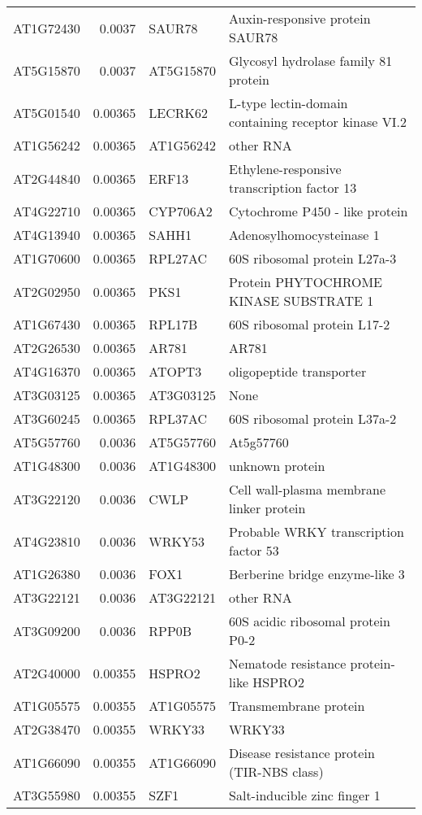 \documentclass[a4paper]{article}
\begin{document}
\begin{center}
\begin{tabular}{lrll}
AT1G72430 & 0.0037 & SAUR78 & Auxin-responsive protein SAUR78\\
AT5G15870 & 0.0037 & AT5G15870 & Glycosyl hydrolase family 81 protein\\
AT5G01540 & 0.00365 & LECRK62 & L-type lectin-domain containing receptor kinase VI.2\\
AT1G56242 & 0.00365 & AT1G56242 & other RNA\\
AT2G44840 & 0.00365 & ERF13 & Ethylene-responsive transcription factor 13\\
AT4G22710 & 0.00365 & CYP706A2 & Cytochrome P450 - like protein\\
AT4G13940 & 0.00365 & SAHH1 & Adenosylhomocysteinase 1\\
AT1G70600 & 0.00365 & RPL27AC & 60S ribosomal protein L27a-3\\
AT2G02950 & 0.00365 & PKS1 & Protein PHYTOCHROME KINASE SUBSTRATE 1\\
AT1G67430 & 0.00365 & RPL17B & 60S ribosomal protein L17-2\\
AT2G26530 & 0.00365 & AR781 & AR781\\
AT4G16370 & 0.00365 & ATOPT3 & oligopeptide transporter\\
AT3G03125 & 0.00365 & AT3G03125 & None\\
AT3G60245 & 0.00365 & RPL37AC & 60S ribosomal protein L37a-2\\
AT5G57760 & 0.0036 & AT5G57760 & At5g57760\\
AT1G48300 & 0.0036 & AT1G48300 & unknown protein\\
AT3G22120 & 0.0036 & CWLP & Cell wall-plasma membrane linker protein\\
AT4G23810 & 0.0036 & WRKY53 & Probable WRKY transcription factor 53\\
AT1G26380 & 0.0036 & FOX1 & Berberine bridge enzyme-like 3\\
AT3G22121 & 0.0036 & AT3G22121 & other RNA\\
AT3G09200 & 0.0036 & RPP0B & 60S acidic ribosomal protein P0-2\\
AT2G40000 & 0.00355 & HSPRO2 & Nematode resistance protein-like HSPRO2\\
AT1G05575 & 0.00355 & AT1G05575 & Transmembrane protein\\
AT2G38470 & 0.00355 & WRKY33 & WRKY33\\
AT1G66090 & 0.00355 & AT1G66090 & Disease resistance protein (TIR-NBS class)\\
AT3G55980 & 0.00355 & SZF1 & Salt-inducible zinc finger 1\\

\end{tabular}
\end{center}
\end{document}
